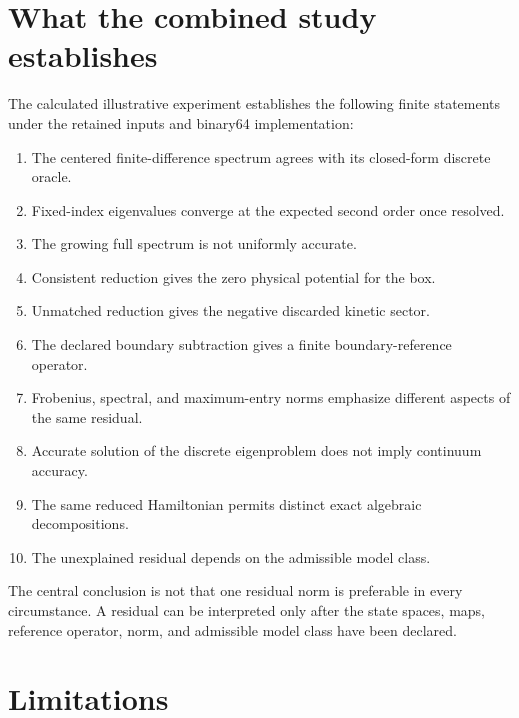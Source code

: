 \documentclass[11pt]{article}
\begin{document}
\section{What the combined study establishes}

The calculated illustrative experiment establishes the following finite
statements under the retained inputs and binary64 implementation:
\begin{enumerate}
  \item The centered finite-difference spectrum agrees with its closed-form
        discrete oracle.
  \item Fixed-index eigenvalues converge at the expected second order once
        resolved.
  \item The growing full spectrum is not uniformly accurate.
  \item Consistent reduction gives the zero physical potential for the box.
  \item Unmatched reduction gives the negative discarded kinetic sector.
  \item The declared boundary subtraction gives a finite boundary-reference
        operator.
  \item Frobenius, spectral, and maximum-entry norms emphasize different
        aspects of the same residual.
  \item Accurate solution of the discrete eigenproblem does not imply
        continuum accuracy.
  \item The same reduced Hamiltonian permits distinct exact algebraic
        decompositions.
  \item The unexplained residual depends on the admissible model class.
\end{enumerate}

The central conclusion is not that one residual norm is preferable in every
circumstance. A residual can be interpreted only after the state spaces, maps,
reference operator, norm, and admissible model class have been declared.

\section{Limitations}
\end{document}
